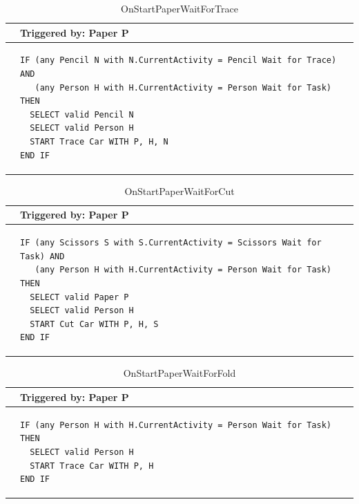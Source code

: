 \documentclass[
  10pt,
  a4paperpaper,
  DIV=11,
  numbers=noendperiod,
  oneside]{scrreprt}
\begin{document}
\begin{longtable}{@{}>{\raggedright\arraybackslash}p{0.25cm}>{\raggedright\arraybackslash}p{13cm}@{}}

\caption{\label{tbl-start_paper_wait_trace}OnStartPaperWaitForTrace}

\tabularnewline

  \toprule
   & Triggered by: Paper P\\ \midrule 
  &
\begin{lstlisting}[language=CMPseudo]
IF (any Pencil N with N.CurrentActivity = Pencil Wait for Trace) AND
   (any Person H with H.CurrentActivity = Person Wait for Task) THEN
  SELECT valid Pencil N
  SELECT valid Person H
  START Trace Car WITH P, H, N
END IF
\end{lstlisting}
  \\ \bottomrule
  

\end{longtable}

\begin{longtable}{@{}>{\raggedright\arraybackslash}p{0.25cm}>{\raggedright\arraybackslash}p{13cm}@{}}

\caption{\label{tbl-start_paper_wait_cut}OnStartPaperWaitForCut}

\tabularnewline

  \toprule
   & Triggered by: Paper P\\ \midrule 
  &
\begin{lstlisting}[language=CMPseudo]
IF (any Scissors S with S.CurrentActivity = Scissors Wait for Task) AND
   (any Person H with H.CurrentActivity = Person Wait for Task) THEN
  SELECT valid Paper P
  SELECT valid Person H
  START Cut Car WITH P, H, S
END IF
\end{lstlisting}
  \\ \bottomrule
  

\end{longtable}

\begin{longtable}{@{}>{\raggedright\arraybackslash}p{0.25cm}>{\raggedright\arraybackslash}p{13cm}@{}}

\caption{\label{tbl-start_paper_wait_fold}OnStartPaperWaitForFold}

\tabularnewline

  \toprule
   & Triggered by: Paper P\\ \midrule 
  &
\begin{lstlisting}[language=CMPseudo]
IF (any Person H with H.CurrentActivity = Person Wait for Task) THEN
  SELECT valid Person H
  START Trace Car WITH P, H
END IF
\end{lstlisting}
  \\ \bottomrule
  

\end{longtable}
\end{document}
